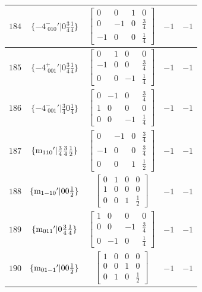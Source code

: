 \documentclass[fleqn,8pt]{jsarticle}
\begin{document}
\begin{longtable}{ccccc}
$ 184 $ & $ \{-4^{-}_{\,\,010}{}'|0 \frac{3}{4} \frac{1}{4}\} $ & $ \begin{bmatrix} 0 & 0 & 1 & 0 \\ 0 & -1 & 0 & \frac{3}{4} \\ -1 & 0 & 0 & \frac{1}{4} \end{bmatrix} $ & $ -1 $ & $ -1 $ \\ \hline
$ 185 $ & $ \{-4^{+}_{\,\,001}{}'|0 \frac{3}{4} \frac{1}{4}\} $ & $ \begin{bmatrix} 0 & 1 & 0 & 0 \\ -1 & 0 & 0 & \frac{3}{4} \\ 0 & 0 & -1 & \frac{1}{4} \end{bmatrix} $ & $ -1 $ & $ -1 $ \\ \hline
$ 186 $ & $ \{-4^{-}_{\,\,001}{}'|\frac{3}{4} 0 \frac{1}{4}\} $ & $ \begin{bmatrix} 0 & -1 & 0 & \frac{3}{4} \\ 1 & 0 & 0 & 0 \\ 0 & 0 & -1 & \frac{1}{4} \end{bmatrix} $ & $ -1 $ & $ -1 $ \\ \hline
$ 187 $ & $ \{{\rm m}_{110}{}'|\frac{3}{4} \frac{3}{4} \frac{1}{2}\} $ & $ \begin{bmatrix} 0 & -1 & 0 & \frac{3}{4} \\ -1 & 0 & 0 & \frac{3}{4} \\ 0 & 0 & 1 & \frac{1}{2} \end{bmatrix} $ & $ -1 $ & $ -1 $ \\ \hline
$ 188 $ & $ \{{\rm m}_{1-10}{}'|0 0 \frac{1}{2}\} $ & $ \begin{bmatrix} 0 & 1 & 0 & 0 \\ 1 & 0 & 0 & 0 \\ 0 & 0 & 1 & \frac{1}{2} \end{bmatrix} $ & $ -1 $ & $ -1 $ \\ \hline
$ 189 $ & $ \{{\rm m}_{011}{}'|0 \frac{3}{4} \frac{1}{4}\} $ & $ \begin{bmatrix} 1 & 0 & 0 & 0 \\ 0 & 0 & -1 & \frac{3}{4} \\ 0 & -1 & 0 & \frac{1}{4} \end{bmatrix} $ & $ -1 $ & $ -1 $ \\ \hline
$ 190 $ & $ \{{\rm m}_{01-1}{}'|0 0 \frac{1}{2}\} $ & $ \begin{bmatrix} 1 & 0 & 0 & 0 \\ 0 & 0 & 1 & 0 \\ 0 & 1 & 0 & \frac{1}{2} \end{bmatrix} $ & $ -1 $ & $ -1 $ \\ \hline

\end{longtable}
\end{document}

